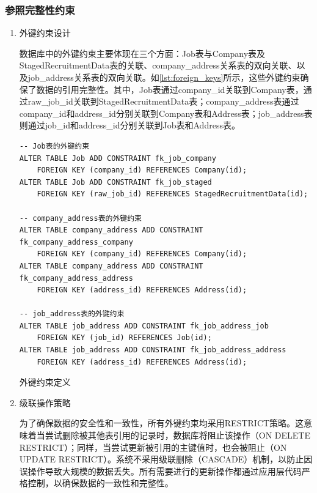\subsubsection{参照完整性约束}

\begin{enumerate}
  \item 外键约束设计
  
  数据库中的外键约束主要体现在三个方面：Job表与Company表及StagedRecruitmentData表的关联、company\_address关系表的双向关联、以及job\_address关系表的双向关联。如\cref{lst:foreign_keys}所示，这些外键约束确保了数据的引用完整性。其中，Job表通过company\_id关联到Company表，通过raw\_job\_id关联到StagedRecruitmentData表；company\_address表通过company\_id和address\_id分别关联到Company表和Address表；job\_address表则通过job\_id和address\_id分别关联到Job表和Address表。

  \begin{listing}[htbp]
    \begin{verbatim}
-- Job表的外键约束
ALTER TABLE Job ADD CONSTRAINT fk_job_company
    FOREIGN KEY (company_id) REFERENCES Company(id);
ALTER TABLE Job ADD CONSTRAINT fk_job_staged
    FOREIGN KEY (raw_job_id) REFERENCES StagedRecruitmentData(id);

-- company_address表的外键约束
ALTER TABLE company_address ADD CONSTRAINT fk_company_address_company
    FOREIGN KEY (company_id) REFERENCES Company(id);
ALTER TABLE company_address ADD CONSTRAINT fk_company_address_address
    FOREIGN KEY (address_id) REFERENCES Address(id);

-- job_address表的外键约束
ALTER TABLE job_address ADD CONSTRAINT fk_job_address_job
    FOREIGN KEY (job_id) REFERENCES Job(id);
ALTER TABLE job_address ADD CONSTRAINT fk_job_address_address
    FOREIGN KEY (address_id) REFERENCES Address(id);
    \end{verbatim}
    \caption{外键约束定义}\label{lst:foreign_keys}
  \end{listing}

  \item 级联操作策略
  
  为了确保数据的安全性和一致性，所有外键约束均采用RESTRICT策略。这意味着当尝试删除被其他表引用的记录时，数据库将阻止该操作（ON DELETE RESTRICT）；同样，当尝试更新被引用的主键值时，也会被阻止（ON UPDATE RESTRICT）。系统不采用级联删除（CASCADE）机制，以防止因误操作导致大规模的数据丢失。所有需要进行的更新操作都通过应用层代码严格控制，以确保数据的一致性和完整性。
\end{enumerate}

